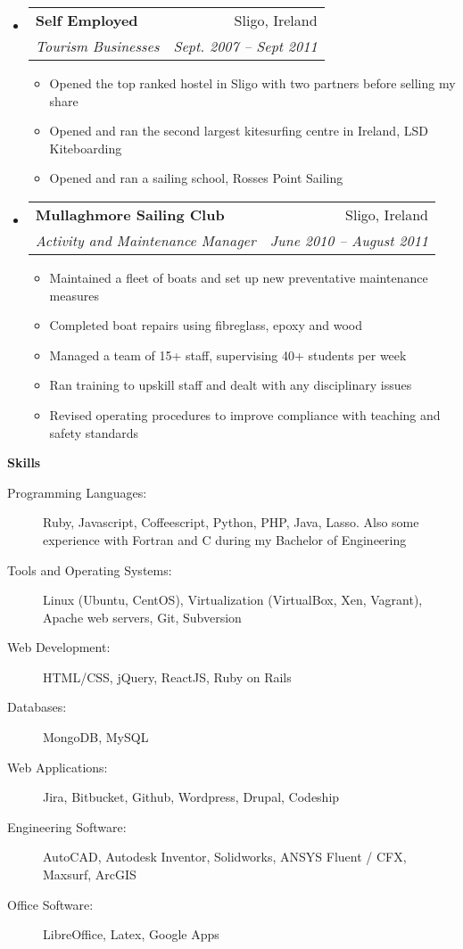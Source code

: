 \documentclass[letterpaper,11pt]{article}
\makeatletter
\newcommand{\resitem}[1]{\item #1 \vspace{-2pt}}
\newcommand{\resheading}[1]{{\large \colorbox{mygrey}{\begin{minipage}{\textwidth}{\textbf{#1 \vphantom{p\^{E}}}}\end{minipage}}}}
\newcommand{\ressubheading}[4]{
\begin{tabular*}{6.5in}{l@{\extracolsep{\fill}}r}
		\textbf{#1} & #2 \\
		\textit{#3} & \textit{#4} \\
\end{tabular*}\vspace{-6pt}}
\makeatother
\begin{document}
\begin{itemize}
      \item 
      \ressubheading{Self Employed}{Sligo, Ireland}{Tourism Businesses}{Sept. 2007 -- Sept 2011}
        { \footnotesize
        \begin{itemize}
         \resitem{Opened the top ranked hostel in Sligo with two partners before selling my share}
        \resitem{Opened and ran the second largest kitesurfing centre in Ireland, LSD Kiteboarding}
        \resitem{Opened and ran a sailing school, Rosses Point Sailing}
        \end{itemize}
        }
        
      \item
      \ressubheading{Mullaghmore Sailing Club}{Sligo, Ireland}{Activity and Maintenance Manager}{June 2010 -- August 2011}
        { \footnotesize
        \begin{itemize}
        \resitem{Maintained a fleet of boats and set up new preventative maintenance measures}
        \resitem{Completed boat repairs using fibreglass, epoxy and wood}
        \resitem{Managed a team of 15+ staff, supervising 40+ students per week}
        \resitem{Ran training to upskill staff and dealt with any disciplinary issues}
        \resitem{Revised operating procedures to improve compliance with teaching and safety standards}
        \end{itemize}
        }

  \end{itemize}  %

\resheading{Skills}
  \begin{description}
    \item[Programming Languages:] { \footnotesize Ruby, Javascript, Coffeescript, Python, PHP, Java, Lasso. 
    Also some experience with Fortran and C during my Bachelor of Engineering}
    \item[Tools and Operating Systems:] { \footnotesize Linux (Ubuntu, CentOS), Virtualization (VirtualBox, Xen, Vagrant), Apache web servers, Git, Subversion
    }
    \item[Web Development:] {\footnotesize HTML/CSS, jQuery, ReactJS, Ruby on Rails }
    \item[Databases:] {\footnotesize MongoDB, MySQL}
    \item[Web Applications:] {\footnotesize Jira, Bitbucket, Github, Wordpress, Drupal, Codeship}
    \item[Engineering Software:]{\footnotesize AutoCAD, Autodesk Inventor, Solidworks, ANSYS Fluent / CFX, Maxsurf, ArcGIS}
    \item[Office Software:]{\footnotesize LibreOffice, Latex, Google Apps} 

  \end{description} %
\end{document}
